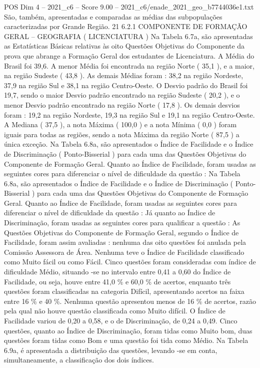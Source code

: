 \begin{textsample}{POS Dim 4 – 2021\_c6 – Score 9.00 – 2021\_c6/enade\_2021\_geo\_b7744036e1.txt}
São, também, apresentadas e comparadas as médias das subpopulações caracterizadas por Grande Região. 21 6.2.1 COMPONENTE DE FORMAÇÃO GERAL – GEOGRAFIA ( LICENCIATURA ) Na Tabela 6.7a, são apresentadas as Estatísticas Básicas relativas às oito Questões Objetivas do Componente da prova que abrange a Formação Geral dos estudantes de Licenciatura.
A Média do Brasil foi 39,6.
A menor Média foi encontrada na região Norte ( 35,1 ), e a maior, na região Sudeste ( 43,8 ).
As demais Médias foram : 38,2 na região Nordeste, 37,9 na região Sul e 38,1 na região Centro-Oeste.
O Desvio padrão do Brasil foi 19,7, sendo o maior Desvio padrão encontrado na região Sudeste ( 20,2 ), e o menor Desvio padrão encontrado na região Norte ( 17,8 ).
Os demais desvios foram : 19,2 na região Nordeste, 19,3 na região Sul e 19,1 na região Centro-Oeste.
A Mediana ( 37,5 ), a nota Máxima ( 100,0 ) e a nota Mínima ( 0,0 ) foram iguais para todas as regiões, sendo a nota Máxima da região Norte ( 87,5 ) a única exceção.
Na Tabela 6.8a, são apresentados o Índice de Facilidade e o Índice de Discriminação ( Ponto-Bisserial ) para cada uma das Questões Objetivas do Componente de Formação Geral.
Quanto ao Índice de Facilidade, foram usadas as seguintes cores para diferenciar o nível de dificuldade da questão : Na Tabela 6.8a, são apresentados o Índice de Facilidade e o Índice de Discriminação ( Ponto-Bisserial ) para cada uma das Questões Objetivas do Componente de Formação Geral.
Quanto ao Índice de Facilidade, foram usadas as seguintes cores para diferenciar o nível de dificuldade da questão : Já quanto ao Índice de Discriminação, foram usadas as seguintes cores para qualificar a questão : As Questões Objetivas do Componente de Formação Geral, segundo o Índice de Facilidade, foram assim avaliadas : nenhuma das oito questões foi anulada pela Comissão Assessora de Área.
Nenhuma teve o Índice de Facilidade classificado como Muito fácil ou como Fácil.
Cinco questões foram consideradas com índice de dificuldade Médio, situando -se no intervalo entre 0,41 a 0,60 do Índice de Facilidade, ou seja, houve entre 41,0 \% e 60,0 \% de acertos, enquanto três questões foram classificadas na categoria Difícil, apresentando acertos na faixa entre 16 \% e 40 \%.
Nenhuma questão apresentou menos de 16 \% de acertos, razão pela qual não houve questão classificada como Muito difícil.
O Índice de Facilidade variou de 0,20 a 0,58, e o de Discriminação, de 0,24 a 0,49.
Cinco questões, quanto ao Índice de Discriminação, foram tidas como Muito bom, duas questões foram tidas como Bom e uma questão foi tida como Médio.
Na Tabela 6.9a, é apresentada a distribuição das questões, levando -se em conta, simultaneamente, a classificação dos dois índices.

\end{textsample}
